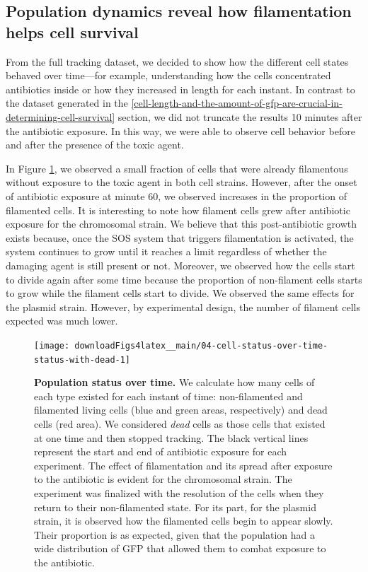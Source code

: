 \documentclass[a4paper, nobind]{templates/ociamthesis}
\begin{document}
\hypertarget{population-dynamics-reveal-how-filamentation-helps-cell-survival}{%
\subsection{Population dynamics reveal how filamentation helps cell survival}\label{population-dynamics-reveal-how-filamentation-helps-cell-survival}}

From the full tracking dataset, we decided to show how the different cell states behaved over time---for example, understanding how the cells concentrated antibiotics inside or how they increased in length for each instant.
In contrast to the dataset generated in the \ref{cell-length-and-the-amount-of-gfp-are-crucial-in-determining-cell-survival} section, we did not truncate the results 10 minutes after the antibiotic exposure.
In this way, we were able to observe cell behavior before and after the presence of the toxic agent.

In Figure \ref{fig:04-cell-status-over-time-status-with-dead-1}, we observed a small fraction of cells that were already filamentous without exposure to the toxic agent in both cell strains.
However, after the onset of antibiotic exposure at minute 60, we observed increases in the proportion of filamented cells.
It is interesting to note how filament cells grew after antibiotic exposure for the chromosomal strain.
We believe that this post-antibiotic growth exists because, once the SOS system that triggers filamentation is activated, the system continues to grow until it reaches a limit regardless of whether the damaging agent is still present or not.
Moreover, we observed how the cells start to divide again after some time because the proportion of non-filament cells starts to grow while the filament cells start to divide.
We observed the same effects for the plasmid strain.
However, by experimental design, the number of filament cells expected was much lower.





\begin{figure}[H]
\texttt{[image: downloadFigs4latex\_\_main/04-cell-status-over-time-status-with-dead-1]} \caption[Population status over time.]{\textbf{Population status over time.} We calculate how many cells of each type existed for each instant of time: non-filamented and filamented living cells (blue and green areas, respectively) and dead cells (red area). We considered \emph{dead} cells as those cells that existed at one time and then stopped tracking. The black vertical lines represent the start and end of antibiotic exposure for each experiment. The effect of filamentation and its spread after exposure to the antibiotic is evident for the chromosomal strain. The experiment was finalized with the resolution of the cells when they return to their non-filamented state. For its part, for the plasmid strain, it is observed how the filamented cells begin to appear slowly. Their proportion is as expected, given that the population had a wide distribution of GFP that allowed them to combat exposure to the antibiotic.}\label{fig:04-cell-status-over-time-status-with-dead-1}
\end{figure}
\end{document}
